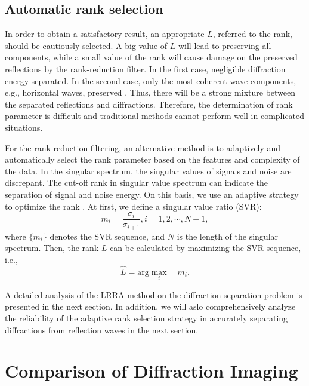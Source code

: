 \subsection{Automatic rank selection}
In order to obtain a satisfactory result, an appropriate $L$, referred to the rank, should be cautiously selected.  A big value of $L$ will lead to preserving all components, while a small value of the rank will cause damage on the preserved reflections by the rank-reduction filter.  In the first case, negligible diffraction energy  separated. In the second case, only the most coherent wave components, e.g., horizontal waves,  preserved \cite[]{yangkang2017lsrtm,yangkang2019nc}. Thus, there will be a strong mixture between the separated reflections and diffractions. Therefore, the determination of rank parameter is difficult and traditional methods  \cite[]{Vicente2011Simultaneous} cannot perform well in complicated situations. 

For the rank-reduction filtering, an alternative method is to adaptively and automatically select the rank parameter based on the features and complexity of the data. In the singular spectrum, the singular values of signals and noise are discrepant. The cut-off rank in singular value spectrum can indicate the separation of signal and noise energy. On this basis, we use an adaptive strategy to optimize the rank \cite[]{yangkang2017lsrtm,yangkang2019nc}.  At first, we define a singular value ratio (SVR):
\begin{equation} 
\label{eq:svr}
m_i=\dfrac{\sigma_i}{\sigma_{i+1}},i=1,2,\cdots,N-1,
\end{equation}
where $\{m_i\}$ denotes the SVR sequence, and $N$ is the length of the singular spectrum. Then, the rank $L$ can be calculated by maximizing the  SVR sequence, i.e.,
\begin{equation} \label{eq:svr}
\hat{L}=\text{arg} \max\limits_i\quad m_i.
\end{equation}

A detailed analysis of the LRRA method on the diffraction separation problem is presented in the next section. In addition, we will aslo comprehensively analyze the reliability of the adaptive rank selection strategy in accurately separating diffractions from reflection waves in the next section. 



\section{Comparison of Diffraction Imaging}
